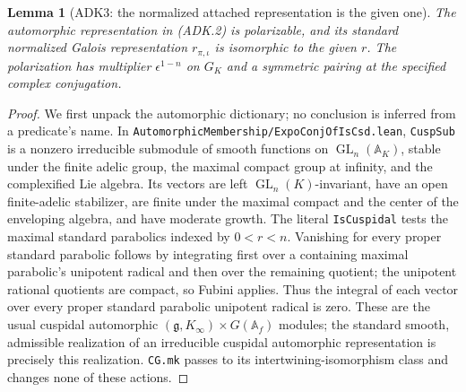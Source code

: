 \documentclass[11pt,a4paper]{article}
\numberwithin{equation}{section}
\newtheorem{lemma}[theorem]{Lemma}
\theoremstyle{remark}\newtheorem{remark}[theorem]{Remark}
\begin{document}
\begin{lemma}[ADK3: the normalized attached representation is the given one]
\label{claim:ADK3}
The automorphic representation in (ADK.2) is polarizable, and its
standard normalized Galois representation $r_{\pi,\iota}$ is
isomorphic to the given $r$.  The polarization has multiplier
$\epsilon^{1-n}$ on $G_K$ and a symmetric pairing at the specified
complex conjugation.
\end{lemma}
\begin{proof}
We first unpack the automorphic dictionary; no conclusion is inferred
from a predicate's name.  In
\texttt{Automorphic\allowbreak Membership/\allowbreak Expo\allowbreak Conj\allowbreak Of\allowbreak Is\allowbreak Csd.\allowbreak lean},
\texttt{Cusp\allowbreak Sub} is a nonzero irreducible submodule of smooth
functions on $\operatorname{GL}_n(\mathbb A_K)$, stable under the
finite adelic group, the maximal compact group at infinity, and the
complexified Lie algebra.  Its vectors are left
$\operatorname{GL}_n(K)$-invariant, have an open finite-adelic
stabilizer, are finite under the maximal compact and the center of
the enveloping algebra, and have moderate growth.  The literal
\texttt{Is\allowbreak Cuspidal} tests the maximal standard parabolics indexed
by $0<r<n$.  Vanishing for every proper standard parabolic follows
by integrating first over a containing maximal parabolic's
unipotent radical and then over the remaining quotient; the
unipotent rational quotients are compact, so Fubini applies.
Thus the integral of each vector over every proper standard
parabolic unipotent radical is zero.  These are the usual cuspidal
automorphic $(\mathfrak g,\allowbreak{} K_\infty)\times G(\mathbb A_f)$ modules;
the standard smooth, admissible realization of an irreducible
cuspidal automorphic representation is precisely this realization.
\texttt{CG.\allowbreak mk} passes to its intertwining-isomorphism class and
changes none of these actions.


\end{proof}
\end{document}
